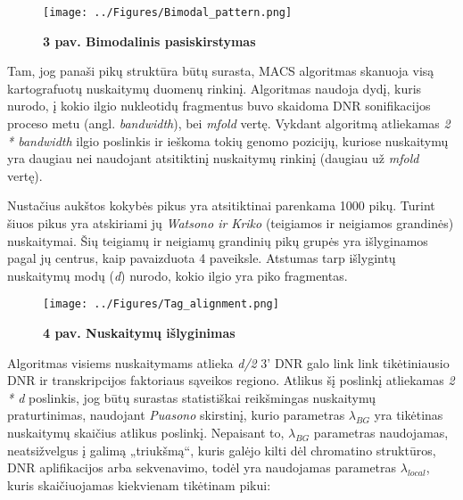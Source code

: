 \documentclass[12pt]{article}
\begin{document}
\begin{figure}[ht]
    \begin{center}
        \texttt{[image: ../Figures/Bimodal\_pattern.png]}
        \vspace{-1\baselineskip}
        \caption*{\small\textbf{3 pav. Bimodalinis pasiskirstymas}}
        \label{fig:birds}
    \end{center}
\end{figure}

Tam, jog panaši pikų struktūra būtų surasta, MACS algoritmas skanuoja visą
kartografuotų nuskaitymų duomenų rinkinį. Algoritmas naudoja dydį, kuris nurodo,
į kokio ilgio nukleotidų fragmentus buvo skaidoma DNR sonifikacijos proceso
metu (angl. \emph{bandwidth}), bei \emph{mfold} vertę. Vykdant algoritmą
atliekamas \emph{2 * bandwidth} ilgio poslinkis ir ieškoma tokių genomo
pozicijų, kuriose nuskaitymų yra daugiau nei naudojant atsitiktinį nuskaitymų
rinkinį (daugiau už \emph{mfold} vertę).

Nustačius aukštos kokybės pikus yra atsitiktinai parenkama 1000 pikų. Turint
šiuos pikus yra atskiriami jų \emph{Watsono ir Kriko} (teigiamos ir neigiamos
grandinės) nuskaitymai.
Šių teigiamų ir neigiamų grandinių pikų grupės yra išlyginamos pagal jų
centrus, kaip pavaizduota 4 paveiksle. Atstumas tarp išlygintų nuskaitymų
modų (\emph{d}) nurodo, kokio ilgio yra piko fragmentas.

\begin{figure}[ht]
    \begin{center}
        \texttt{[image: ../Figures/Tag\_alignment.png]}
        \vspace{-1\baselineskip}
        \caption*{\small\textbf{4 pav. Nuskaitymų išlyginimas}}
        \label{fig:birds}
    \end{center}
\end{figure}

Algoritmas visiems nuskaitymams atlieka \emph{d/2} 3' DNR galo link link
tikėtiniausio DNR ir transkripcijos faktoriaus sąveikos regiono. Atlikus šį
poslinkį atliekamas \emph{2 * d} poslinkis, jog būtų surastas statistiškai
reikšmingas nuskaitymų praturtinimas, naudojant \emph{Puasono} skirstinį, kurio
parametras \(\lambda_{BG}\) yra tikėtinas nuskaitymų skaičius atlikus poslinkį.
Nepaisant to, \(\lambda_{BG}\) parametras naudojamas,
neatsižvelgus į galimą „triukšmą“, kuris galėjo kilti dėl chromatino struktūros,
DNR aplifikacijos arba sekvenavimo, todėl yra naudojamas parametras
\(\lambda_{local}\), kuris skaičiuojamas kiekvienam tikėtinam
pikui:
\end{document}
